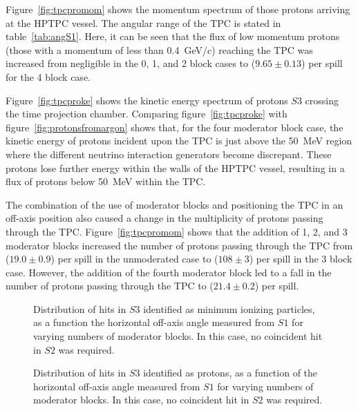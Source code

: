 Figure~\ref{fig:tpcpromom} shows the momentum spectrum of those protons arriving at the HPTPC vessel.
The angular range of the TPC is stated in table~\ref{tab:angS1}.
Here, it can be seen that the flux of low momentum protons (those with a momentum of less than 0.4~GeV/c) reaching the TPC was increased from negligible in the 0, 1, and 2 block cases to ($9.65 \pm 0.13$) per spill for the 4 block case.

Figure~\ref{fig:tpcproke} shows the kinetic energy spectrum of protons $\mathit{S3}$ crossing the time projection chamber.
Comparing figure~\ref{fig:tpcproke} with figure~\ref{fig:protonsfromargon} shows that, for the four moderator block case, the kinetic energy of protons incident upon the TPC is just above the 50~MeV region where the different neutrino interaction generators become discrepant.
These protons lose further energy within the walls of the HPTPC vessel, resulting in a flux of protons below 50~MeV within the TPC.

The combination of the use of moderator blocks and positioning the TPC in an off-axis position also caused a change in the multiplicity of protons passing through the TPC.
Figure~\ref{fig:tpcpromom} shows that the addition of 1, 2, and 3 moderator blocks increased the number of protons passing through the TPC from ($19.0 \pm 0.9$) per spill in the unmoderated case to ($108 \pm 3$) per spill in the 3 block case.
However, the addition of the fourth moderator block led to a fall in the number of protons passing through the TPC to ($21.4 \pm 0.2$) per spill.
  
\begin{figure}[h]
  \begin{minipage}{0.48\textwidth}
    \begin{adjustbox}{max totalsize={\textwidth}{.35\textheight},center}
      
    \end{adjustbox}
    \caption{Distribution of hits in $\mathit{S3}$ identified as minimum ionizing particles, as a function the horizontal off-axis angle measured from $\mathit{S1}$ for varying numbers of moderator blocks. In this case, no coincident hit in $\mathit{S2}$ was required.}
    \label{fig:s1s3mips}
  \end{minipage}
  \hspace{0.3cm}
  \begin{minipage}{0.48\textwidth}
    \begin{adjustbox}{max totalsize={\textwidth}{.35\textheight},center}
      
    \end{adjustbox}
    \caption{Distribution of hits in $\mathit{S3}$ identified as protons, as a function of the horizontal off-axis angle measured from $\mathit{S1}$ for varying numbers of moderator blocks. In this case, no coincident hit in $\mathit{S2}$ was required.}
    \label{fig:s1s3protons}
  \end{minipage}
\end{figure}

